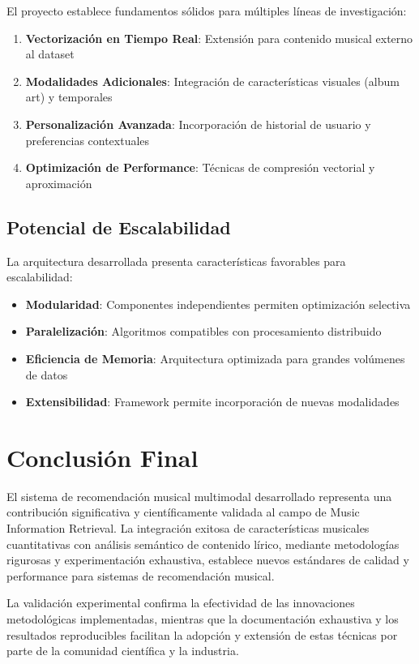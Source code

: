 \documentclass[12pt,a4paper]{report}
\begin{document}
El proyecto establece fundamentos sólidos para múltiples líneas de investigación:

\begin{enumerate}
\item \textbf{Vectorización en Tiempo Real}: Extensión para contenido musical externo al dataset
\item \textbf{Modalidades Adicionales}: Integración de características visuales (album art) y temporales
\item \textbf{Personalización Avanzada}: Incorporación de historial de usuario y preferencias contextuales
\item \textbf{Optimización de Performance}: Técnicas de compresión vectorial y aproximación
\end{enumerate}

\subsection{Potencial de Escalabilidad}

La arquitectura desarrollada presenta características favorables para escalabilidad:

\begin{itemize}
\item \textbf{Modularidad}: Componentes independientes permiten optimización selectiva
\item \textbf{Paralelización}: Algoritmos compatibles con procesamiento distribuido
\item \textbf{Eficiencia de Memoria}: Arquitectura optimizada para grandes volúmenes de datos
\item \textbf{Extensibilidad}: Framework permite incorporación de nuevas modalidades
\end{itemize}

\section{Conclusión Final}

El sistema de recomendación musical multimodal desarrollado representa una contribución significativa y científicamente validada al campo de Music Information Retrieval. La integración exitosa de características musicales cuantitativas con análisis semántico de contenido lírico, mediante metodologías rigurosas y experimentación exhaustiva, establece nuevos estándares de calidad y performance para sistemas de recomendación musical.

La validación experimental confirma la efectividad de las innovaciones metodológicas implementadas, mientras que la documentación exhaustiva y los resultados reproducibles facilitan la adopción y extensión de estas técnicas por parte de la comunidad científica y la industria.
\end{document}
